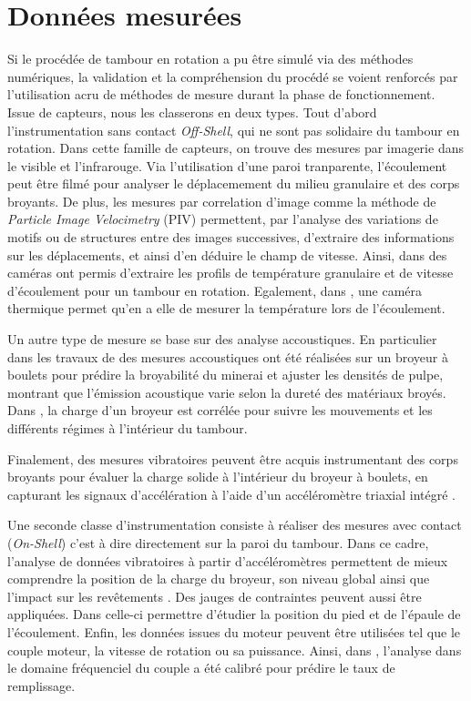 \section{Données mesurées}

Si le procédée de tambour en rotation a pu être simulé via des méthodes numériques, la validation et la compréhension du procédé se voient renforcés par l'utilisation acru de méthodes de mesure durant la phase de fonctionnement. Issue de capteurs, nous les classerons en deux types. Tout d'abord l'instrumentation sans contact \textit{Off-Shell}, qui ne sont pas solidaire du tambour en rotation. Dans cette famille de capteurs, on trouve des mesures par imagerie dans le visible et l'infrarouge. Via l'utilisation d'une paroi tranparente, l'écoulement peut être filmé pour analyser le déplacemement du milieu granulaire et des corps broyants. De plus, les mesures par correlation d'image comme la méthode de \textit{Particle Image Velocimetry} (PIV) permettent, par l'analyse des variations de motifs ou de structures entre des images successives, d'extraire des informations sur les déplacements, et ainsi d'en déduire le champ de vitesse. Ainsi, dans \cite{jarray_wet_2019} des caméras ont permis d'extraire les profils de température granulaire et de vitesse d'écoulement pour un tambour en rotation. Egalement, dans \cite{Adepu}, une caméra thermique permet qu'en a elle de mesurer la température lors de l'écoulement.

Un autre type de mesure se base sur des analyse accoustiques. En particulier dans les travaux de \cite{Owusu} des mesures accoustiques ont été réalisées sur un broyeur à boulets pour prédire la broyabilité du minerai et ajuster les densités de pulpe, montrant que l'émission acoustique varie selon la dureté des matériaux broyés. Dans \cite{almond}, la charge d'un broyeur est corrélée pour suivre les mouvements et les différents régimes à l'intérieur du tambour.

Finalement, des mesures vibratoires peuvent être acquis instrumentant des corps broyants pour évaluer la charge solide à l'intérieur du broyeur à boulets, en capturant les signaux d'accélération à l'aide d'un accéléromètre triaxial intégré \cite{Wang}.

Une seconde classe d'instrumentation consiste à réaliser des mesures avec contact (\textit{On-Shell}) c'est à dire directement sur la paroi du tambour. Dans ce cadre, l'analyse de données vibratoires à partir d'accéléromètres permettent de mieux comprendre la position de la charge du broyeur, son niveau global ainsi que l'impact sur les revêtements \cite{Davey}. Des jauges de contraintes peuvent aussi être appliquées. Dans \cite{tano_2005} celle-ci permettre d'étudier la position du pied et de l'épaule de l'écoulement. Enfin, les données issues du moteur peuvent être utilisées tel que le couple moteur, la vitesse de rotation ou sa puissance. Ainsi, dans \cite{pedrayes_frequency_2017}, l'analyse dans le domaine fréquenciel du couple a été calibré pour prédire le taux de remplissage.

